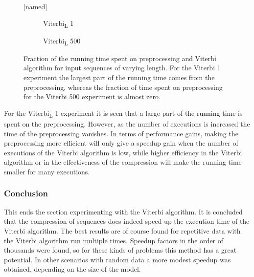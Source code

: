 \begin{figure}
  \centering\ref{named}
  \begin{subfigure}{0.5\textwidth}
    \centering 
    \caption{Viterbi\textsubscript{L} 1}
  \end{subfigure}%
  \begin{subfigure}{0.5\textwidth}
    \centering 
    \caption{Viterbi\textsubscript{L} 500}
  \end{subfigure}

  \caption{Fraction of the running time spent on preprocessing and Viterbi
    algorithm for input sequences of varying length. For the Viterbi 1
    experiment the largest part of the running time comes from the
    preprocessing, whereas the fraction of time spent on preprocessing for
    the Viterbi 500 experiment is almost zero.}
  \label{fig:pre_vs_running}
\end{figure}

For the Viterbi\textsubscript{L} 1 experiment it is seen that a large part of the running time
is spent on the preprocessing. However, as the number of executions is
increased the time of the preprocessing vanishes. In terms of performance
gains, making the preprocessing more efficient will only give a speedup gain
when the number of executions of the Viterbi algorithm is low, while higher
efficiency in the Viterbi algorithm or in the effectiveness of the compression
will make the running time smaller for many executions.

\subsubsection{Conclusion}

This ends the section experimenting with the Viterbi algorithm. It is concluded
that the compression of sequences does indeed speed up the execution time of
the Viterbi algorithm. The best results are of course found for repetitive data
with the Viterbi algorithm run multiple times. Speedup factors in the order of
thousands were found, so for these kinds of problems this method has a great
potential. In other scenarios with random data a more modest speedup was
obtained, depending on the size of the model.


